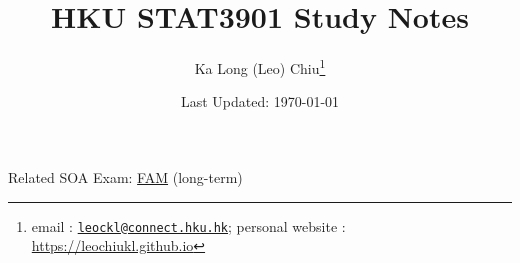 \documentclass{article}
\begin{document}
\title{HKU STAT3901 Study Notes}
\author{Ka Long (Leo) Chiu\thanks{
email :
\href{mailto:leockl@connect.hku.hk}{\texttt{leockl@connect.hku.hk}};
personal website :
\url{https://leochiukl.github.io}
}}
\date{Last Updated: \today}
\maketitle
\doclicenseThis
\begin{note}
Related SOA Exam:
\href{https://www.soa.org/education/exam-req/edu-exam-fam/}{FAM} (long-term)
\end{note}
\tableofcontents





\printbibliography

\end{document}
